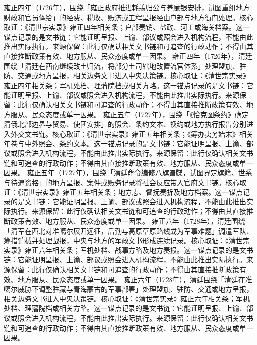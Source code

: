 雍正四年（1726年），围绕「雍正政府推进耗羡归公与养廉银安排，试图重组地方财政和官员俸给」的经费、税收、赈济或工程呈报经由户部与地方衙门处理。核心取证：《清世宗实录》雍正四年相关条；户部奏销、盐政、河工或海关档案。这一锚点记录的是文书链：它能证明呈报、上谕、部议或照会进入机构流程，不能由此推出实际执行。来源保留：此行仅确认相关文书链和可追查的行政动作；不得由其直接推断政策有效、地方服从、民众态度或单一因果。
雍正四年（1726年），清廷围绕「清廷在西南继续改土归流，将部分土司辖地改置流官体系」处理盟旗、驻防、交通或地方呈报，相关边务文书进入中央决策链。核心取证：《清世宗实录》雍正四年相关条；军机处档、理藩院档或相关方略。这一锚点记录的是文书链：它能证明呈报、上谕、部议或照会进入机构流程，不能由此推出实际执行。来源保留：此行仅确认相关文书链和可追查的行政动作；不得由其直接推断政策有效、地方服从、民众态度或单一因果。
雍正五年（1727年），围绕「《恰克图条约》确定清俄北部边界与贸易、使团安排」的照会、条约文本、换约或地方执行报告分别进入外交文书链。核心取证：《清世宗实录》雍正五年相关条；《筹办夷务始末》相关年卷与中外照会、条约文本。这一锚点记录的是文书链：它能证明呈报、上谕、部议或照会进入机构流程，不能由此推出实际执行。来源保留：此行仅确认相关文书链和可追查的行政动作；不得由其直接推断政策有效、地方服从、民众态度或单一因果。
雍正五年（1727年），围绕「清廷命令编修八旗谱牒，试图界定旗籍、世系与待遇资格」的地方呈报、案件或赈务记录将社会反应带入官府文书链。核心取证：《清世宗实录》雍正五年相关条；地方志、督抚奏折及地方档案。这一锚点记录的是文书链：它能证明呈报、上谕、部议或照会进入机构流程，不能由此推出实际执行。来源保留：此行仅确认相关文书链和可追查的行政动作；不得由其直接推断政策有效、地方服从、民众态度或单一因果。
雍正六年（1728年），清廷围绕「清军在西北对准噶尔展开远征，后勤与高原草原路线成为军事难题」调遣军队、筹措饷械并处理战报，中央与地方的军政文书形成连续记录。核心取证：《清世宗实录》雍正六年相关条；军机处档、战事方略及地方奏报。这一锚点记录的是文书链：它能证明呈报、上谕、部议或照会进入机构流程，不能由此推出实际执行。来源保留：此行仅确认相关文书链和可追查的行政动作；不得由其直接推断政策有效、地方服从、民众态度或单一因果。
雍正六年（1728年），清廷围绕「清廷在准噶尔威胁下调整驻藏与青海蒙古的军事部署」处理盟旗、驻防、交通或地方呈报，相关边务文书进入中央决策链。核心取证：《清世宗实录》雍正六年相关条；军机处档、理藩院档或相关方略。这一锚点记录的是文书链：它能证明呈报、上谕、部议或照会进入机构流程，不能由此推出实际执行。来源保留：此行仅确认相关文书链和可追查的行政动作；不得由其直接推断政策有效、地方服从、民众态度或单一因果。
